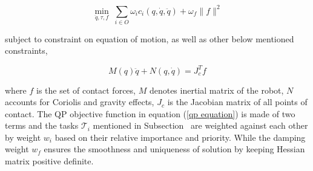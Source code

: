 \begin{equation}\label{qp equation}
\min_{\ddot{q},\tau,f} \; \sum_{i\in O} \omega_i c_i(q,\dot{q},\ddot{q}) + \omega_{f}\lVert f\rVert^2
\end{equation}

subject to constraint on equation of motion, as well as other below mentioned constraints,

\begin{equation}
	M(q)\ddot{q} + N(q,\dot{q}) =  J_c^T f
\end{equation}

where $f$ is the set of contact forces, $M$ denotes inertial matrix of the robot, $N$ accounts for Coriolis  and gravity effects, $J_c$ is the Jacobian matrix of all points of contact. The QP objective function in equation (\ref{qp equation}) is made of two terms and the tasks $\mathscr{T}_i$ mentioned in Subsection~ are weighted against each other by weight $w_i$ based on their relative importance and priority. While the damping weight $w_f$ ensures the smoothness and uniqueness of solution by keeping Hessian matrix positive definite.

